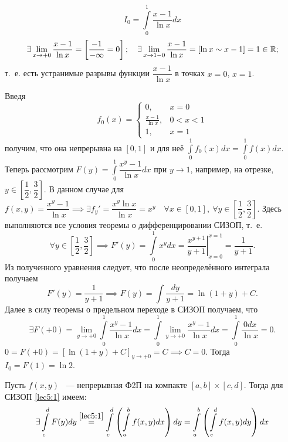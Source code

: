 \documentclass[../../main.tex]{subfiles}
\begin{document}
\begin{exmp}
	\[I_0 = \int\limits_0^1 \dfrac{x - 1}{\ln x} dx\]
	\[ \exists \lim\limits_{x \to +0} \dfrac{x - 1}{\ln x} = \left[
	\dfrac{-1}{-\infty} = 0
	\right]; \quad 
	\exists \lim\limits_{x \to 1 - 0} \dfrac{x - 1}{\ln x} = \left[\ln x \sim 
	\\
	x - 1\right] = 1 \in \mathbb{R};\] т.~е. есть устранимые разрывы функции
	$\dfrac{x - 1}{\ln x}$ в точках $x = 0$, $x = 1$.
	
	Введя \[ f_0(x) = 
	\begin{cases}
		0,& x = 0\\
		\frac{x - 1}{\ln x},& 0 < x < 1\\
		1,& x = 1
	\end{cases}\] получим, что она непрерывна на $ [0, 1] $ и для неё 
	$ \displaystyle\int\limits_0^1 f_0(x) dx = \displaystyle\int\limits_0^1 f(x) 
	dx $.
	Теперь рассмотрим $ F(y) = \displaystyle\int\limits_0^1 \dfrac{x^y - 1}{\ln 
	x} dx $
	при $ y \to 1 $, например, на отрезке, $y \in \left[
	\dfrac{1}{2}, \dfrac{3}{2}
	\right] $. В данном случае для $ f(x, y) = \dfrac{x^y - 1}{\ln x} \implies 
	\exists f_y' = \dfrac{x^y \ln x}{\ln x} = x^y \quad \forall x \in [0, 1],\
	\forall y \in \left[
	\dfrac{1}{2}, \dfrac{3}{2}
	\right] $. Здесь выполняются все условия теоремы о дифференцировании СИЗОП,
	т.~е.\[ \forall y \in \left[\dfrac{1}{2}, \dfrac{3}{2}\right] \implies 
	F'(y) = \displaystyle\int\limits_0^1 x^y dx = \left.\dfrac{x^{y + 1}}{y + 
	1}\right|_{x=0}^{x=1} = \dfrac{1}{y + 1}
	.\] Из полученного уравнения следует, что после
	неопределённого интеграла получаем \[F'(y) = \dfrac{1}{y + 1} 
	\implies F(y) = 
	\int \dfrac{dy}{y + 1} = 
	\ln(1 + y) + C.\] Далее в силу теоремы о предельном переходе в СИЗОП 
	получаем, что
	\[\exists F(+0) = \lim\limits_{y \to +0} \int\limits_0^1 
	\dfrac{x^y - 1}{\ln x} dx = \int\limits_0^1 \lim\limits_{y \to +0} 
	\dfrac{x^y - 1}{\ln x} dx = \int\limits_0^1 \dfrac{0dx}{\ln x} = 0.\]
	$ 0 = F(+0) = \left[\ln(1 + y) + C\right]_{y \to +0} = C \implies C = 0 $.
	Тогда $ I_0 = F(1) = \ln 2 $.
\end{exmp}
\begin{thm}
	Пусть $ f(x, y) $ ~--- непрерывная Ф2П на компакте $ [a, b] \times [c, d]$.
	Тогда для СИЗОП \eqref{lec5:1} имеем:
	\begin{equation}
		\exists \int\limits_c^d F(y) dy \stackrel{\eqref{lec5:1}}{=} 
		\int\limits_c^d \left(
		\int\limits_a^b f(x, y) dx
		\right) dy = 
		\int\limits_a^b \left(
		\int\limits_c^d f(x, y) dy
		\right) dx
	\end{equation}
\end{thm}
\end{document}
